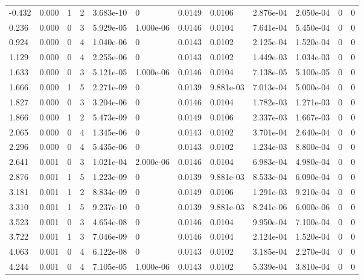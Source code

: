 \documentclass[preview]{standalone}
\begin{document}
{{\begin{tabular}{L{1.2cm}C{1.2cm} C{0.3cm}C{0.5cm} C{1.4cm}C{1.4cm} C{1.4cm}C{1.4cm} C{1.6cm}C{1.6cm} C{1.6cm}C{1.6cm}}
  -0.432  &  0.000  & 1     &  2 &  3.683e-10  & 0  &  0.0149&   0.0106& 2.876e-04 & 2.050e-04   &  0 & 0  \\ 
  0.236  &  0.000  & 0     &  3 &  5.929e-05  & 1.000e-06  &  0.0146&   0.0104& 7.641e-04 & 5.450e-04   &  0 & 0  \\ 
  0.924  &  0.000  & 0     &  4 &  1.040e-06  & 0  &  0.0143&   0.0102& 2.125e-04 & 1.520e-04   &  0 & 0  \\ 
  1.129  &  0.000  & 0     &  4 &  2.255e-06  & 0  &  0.0143&   0.0102& 1.449e-03 & 1.034e-03   &  0 & 0  \\ 
  1.633  &  0.000  & 0     &  3 &  5.121e-05  & 1.000e-06  &  0.0146&   0.0104& 7.138e-05 & 5.100e-05   &  0 & 0  \\ 
  1.666  &  0.000  & 1     &  5 &  2.271e-09  & 0  &  0.0139&   9.881e-03& 7.013e-04 & 5.000e-04   &  0 & 0  \\ 
  1.827  &  0.000  & 0     &  3 &  3.204e-06  & 0  &  0.0146&   0.0104& 1.782e-03 & 1.271e-03   &  0 & 0  \\ 
  1.866  &  0.000  & 1     &  2 &  5.473e-09  & 0  &  0.0149&   0.0106& 2.337e-03 & 1.667e-03   &  0 & 0  \\ 
  2.065  &  0.000  & 0     &  4 &  1.345e-06  & 0  &  0.0143&   0.0102& 3.701e-04 & 2.640e-04   &  0 & 0  \\ 
  2.296  &  0.000  & 0     &  4 &  5.435e-06  & 0  &  0.0143&   0.0102& 1.234e-03 & 8.800e-04   &  0 & 0  \\ 
  2.641  &  0.001  & 0     &  3 &  1.021e-04  & 2.000e-06  &  0.0146&   0.0104& 6.983e-04 & 4.980e-04   &  0 & 0  \\ 
  2.876  &  0.001  & 1     &  5 &  1.223e-09  & 0  &  0.0139&   9.881e-03& 8.533e-04 & 6.090e-04   &  0 & 0  \\ 
  3.181  &  0.001  & 1     &  2 &  8.834e-09  & 0  &  0.0149&   0.0106& 1.291e-03 & 9.210e-04   &  0 & 0  \\ 
  3.310  &  0.001  & 1     &  5 &  9.237e-10  & 0  &  0.0139&   9.881e-03& 8.241e-06 & 6.000e-06   &  0 & 0  \\ 
  3.523  &  0.001  & 0     &  3 &  4.654e-08  & 0  &  0.0146&   0.0104& 9.950e-04 & 7.100e-04   &  0 & 0  \\ 
  3.722  &  0.001  & 1     &  3 &  7.046e-09  & 0  &  0.0146&   0.0104& 2.124e-04 & 1.520e-04   &  0 & 0  \\ 
  4.063  &  0.001  & 0     &  4 &  6.122e-08  & 0  &  0.0143&   0.0102& 3.185e-04 & 2.270e-04   &  0 & 0  \\ 
  4.244  &  0.001  & 0     &  4 &  7.105e-05  & 1.000e-06  &  0.0143&   0.0102& 5.339e-04 & 3.810e-04   &  0 & 0  \\ 

\end{tabular}}}
\end{document}
